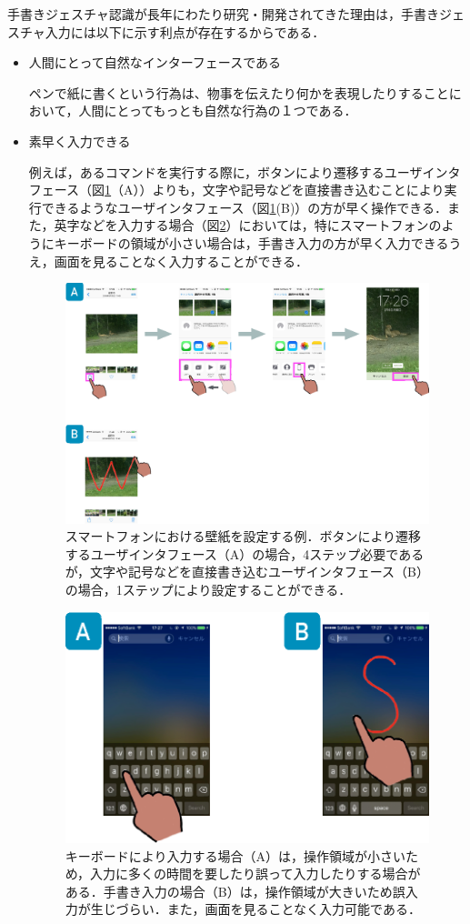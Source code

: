 手書きジェスチャ認識が長年にわたり研究・開発されてきた理由は，手書きジェスチャ入力には以下に示す利点が存在するからである．
\begin{itemize}
 \item 人間にとって自然なインターフェースである
 
ペンで紙に書くという行為は、物事を伝えたり何かを表現したりすることにおいて，人間にとってもっとも自然な行為の１つである．
 \item 素早く入力できる
 
例えば，あるコマンドを実行する際に，ボタンにより遷移するユーザインタフェース（図\ref{fig:wallpaper}（A））よりも，文字や記号などを直接書き込むことにより実行できるようなユーザインタフェース（図\ref{fig:wallpaper}(B)）の方が早く操作できる．また，英字などを入力する場合（図\ref{fig:keyinput}）においては，特にスマートフォンのようにキーボードの領域が小さい場合は，手書き入力の方が早く入力できるうえ，画面を見ることなく入力することができる．

\begin{figure} [htbp]
\centering
\includegraphics [width=0.85\columnwidth]{img/wallpaper.eps}
\caption{スマートフォンにおける壁紙を設定する例．ボタンにより遷移するユーザインタフェース（A）の場合，4ステップ必要であるが，文字や記号などを直接書き込むユーザインタフェース（B）の場合，1ステップにより設定することができる．}
\label{fig:wallpaper}
\end{figure}

\begin{figure} [htbp]
\centering
\includegraphics [width=0.5\columnwidth]{img/keyinput.eps}
\caption{キーボードにより入力する場合（A）は，操作領域が小さいため，入力に多くの時間を要したり誤って入力したりする場合がある．手書き入力の場合（B）は，操作領域が大きいため誤入力が生じづらい．また，画面を見ることなく入力可能である．}
\label{fig:keyinput}
\end{figure}


\end{itemize}
